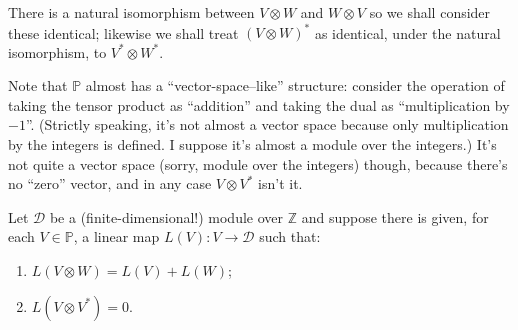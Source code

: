 \documentclass[a4paper, twocolumn, 10pt]{article}
\newcommand{\physics}{\mathbb{P}}
\newcommand{\dimensions}{\mathcal{D}}
\newcommand{\integers}{\mathbb{Z}}
\begin{document}
There is a natural isomorphism between $V\otimes W$ and $W\otimes V$ so we shall
consider these identical; likewise we shall treat $(V\otimes W)^*$ as identical,
under the natural isomorphism, to $V^*\otimes W^*$. 

Note that $\physics$ almost has a ``vector-space--like'' structure: consider the
operation of taking the tensor product as ``addition'' and taking the dual as
``multiplication by $-1$''. (Strictly speaking, it's not almost a vector space because
only multiplication by the integers is defined. I suppose it's almost a module over the
integers.) It's not quite a vector space (sorry, module over the integers)
though, because there's no ``zero'' vector, and in any case $V\otimes V^*$ isn't it.  

Let $\dimensions$ be a (finite-dimensional!) module over $\integers$ and suppose there is
given, for each $V\in\physics$, a linear map $L(V):V\to\dimensions$ such that:
\begin{enumerate}
\item $L(V\otimes W) = L(V) + L(W)$;
\item $L(V\otimes V^*) = 0$.
\end{enumerate}



  
\end{document}
